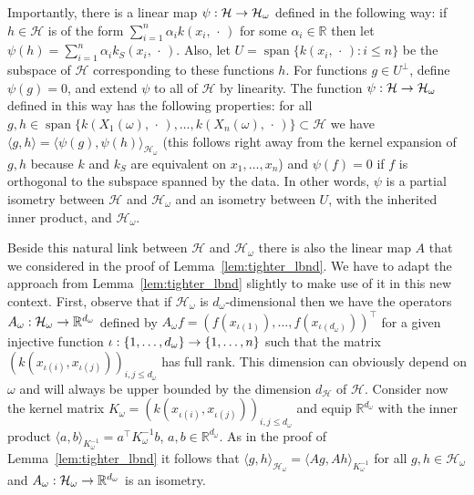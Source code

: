 \documentclass[AHL,Unicode,longabstracts,published]{cedram}
\theoremstyle{remark}
\DeclareMathOperator{\spn}{span}
\newcommand{\R}{\mathbb{R}}
\newcommand{\cH}{\mathcal{H}}
\renewcommand*{\to}{\mathchoice{\longrightarrow}{\rightarrow}{\rightarrow}{\rightarrow}}
\begin{document}
Importantly, there is a linear map $\psi:\cH \to \cH_\omega$ defined in the following way: if $h \in \cH$ is of the form $\sum_{i=1}^n \alpha_i k(x_i,\,\cdot\,)$ for some $\alpha_i \in \R$ then let $\psi(h) = \sum_{i=1}^n \alpha_i k_S(x_i,\,\cdot\,)$. Also, let $U = \spn \{k(x_i,\,\cdot\,) : i \leq n\}$ be the subspace of $\cH$ corresponding to these functions $h$. For functions $g \in U^\perp$, define $\psi(g) = 0$, and extend $\psi$ to all of $\cH$ by linearity. The function $\psi: \cH \to \cH_\omega$ defined in this way has the following properties: for all $g,h \in \spn \{k(X_1(\omega),\,\cdot\,), \dots, k(X_n(\omega),\,\cdot\,)\} \subset \cH$ we have $\langle g,h \rangle = \langle \psi(g), \psi(h) \rangle_{\cH_\omega}$ (this follows right away from the kernel expansion of $g,h$ because $k$ and $k_S$ are equivalent on $x_1,\dots,x_n$) and $\psi(f) = 0$ if $f$ is orthogonal to the subspace spanned by the data. In other words, $\psi$ is a partial isometry between $\cH$ and $\cH_\omega$ and an isometry between $U$, with the inherited inner product, and $\cH_\omega$.


Beside this natural link between $\cH$ and $\cH_\omega$ there is also the linear map $A$ that we considered in the proof of Lemma~\ref{lem:tighter_lbnd}. We have to adapt the approach from Lemma~\ref{lem:tighter_lbnd} slightly to make use of it in this new context. First, observe that if $\cH_\omega$ is $d_\omega$-dimensional then we have the operators $A_\omega: \cH_\omega \to \R^{d_\omega}$ defined by $A_\omega f = (f(x_{\iota(1)}), \dots, f(x_{\iota(d_\omega)}))^\top$ for a given injective function $\iota:\{1,\dots, d_\omega\} \to \{1, \dots, n\}$ such that the matrix $(k(x_{\iota(i)},x_{\iota(j)}))_{i,j\leq d_\omega}$ has full rank. This dimension can obviously depend on $\omega$ and will always be upper bounded by the dimension $d_\cH$ of $\cH$. Consider now the kernel matrix $K_\omega = (k(x_{\iota(i)},x_{\iota(j)}))_{i,j \leq d_\omega}$ and equip $\R^{d_\omega}$ with the inner product $\langle a, b \rangle_{K_\omega^{-1}} =a^\top K_\omega^{-1} b$, $a,b \in \R^{d_\omega}$. As in the proof of Lemma~\ref{lem:tighter_lbnd} it follows that $\langle g,h \rangle_{\cH_\omega} = \langle A g, Ah \rangle_{K^{-1}_\omega} $ for all $g,h \in \cH_\omega$ and $A_\omega : \cH_\omega \to \R^{d_\omega}$ is an isometry.
\end{document}
